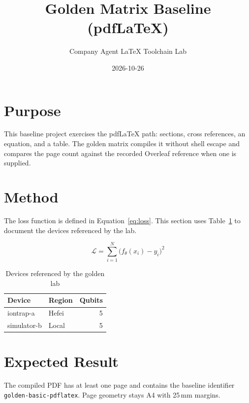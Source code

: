 \documentclass[11pt]{article}
\newcommand{\labid}{golden-basic-pdflatex}
\begin{document}
\title{Golden Matrix Baseline (pdfLaTeX)}
\author{Company Agent LaTeX Toolchain Lab}
\date{2026-10-26}
\maketitle

\section{Purpose}
This baseline project exercises the pdfLaTeX path: sections, cross references,
an equation, and a table. The golden matrix compiles it without shell escape
and compares the page count against the recorded Overleaf reference when one
is supplied.

\section{Method}\label{sec:method}
The loss function is defined in Equation~\eqref{eq:loss}. This section uses
Table~\ref{tab:devices} to document the devices referenced by the lab.

\begin{equation}\label{eq:loss}
  \mathcal{L} = \sum_{i=1}^{N} \bigl(f_{\theta}(x_i) - y_i\bigr)^2
\end{equation}

\begin{table}[ht]
  \centering
  \caption{Devices referenced by the golden lab}
  \label{tab:devices}
  \begin{tabular}{llr}
    \toprule
    Device & Region & Qubits \\
    \midrule
    iontrap-a & Hefei & 5 \\
    simulator-b & Local & 5 \\
    \bottomrule
  \end{tabular}
\end{table}

\section{Expected Result}
The compiled PDF has at least one page and contains the baseline identifier
\texttt{\labid}. Page geometry stays A4 with 25\,mm margins.
\end{document}
